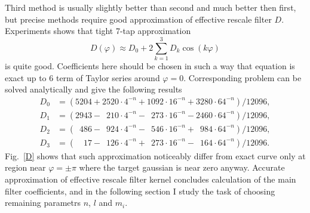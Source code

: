 \documentclass[10pt]{article}
\begin{document}
Third method is usually slightly better than second and much better then first, but precise methods
require good approximation of effective rescale filter $D$. Experiments shows that tight 7-tap
approximation
\begin{equation}
    D(\varphi) \approx D_0 + 2\sum_{k=1}^3 D_k\cos(k\varphi)
\end{equation}
is quite good. Coefficients here should be chosen in such a way that equation is exact up to 6
term of Taylor series around $\varphi = 0$. Corresponding problem can be solved analytically
and give the following results
\newcommand\0{\phantom{0}}
\begin{align}
    D_0 &= (   5204 +   2520\cdot4^{-n} +   1092\cdot16^{-n} +   3280\cdot64^{-n}) / 12096,\\
    D_1 &= (   2943 - \0 210\cdot4^{-n} - \0 273\cdot16^{-n} -   2460\cdot64^{-n}) / 12096,\\
    D_2 &= (\0  486 - \0 924\cdot4^{-n} - \0 546\cdot16^{-n} + \0 984\cdot64^{-n}) / 12096,\\
    D_3 &= (\0\0 17 - \0 126\cdot4^{-n} + \0 273\cdot16^{-n} - \0 164\cdot64^{-n}) / 12096.
\end{align}
Fig.~\ref{D} shows that such approximation noticeably differ from exact curve only at region near
$\varphi = \pm\pi$ where the target gaussian is near zero anyway. Accurate approximation of
effective rescale filter kernel concludes calculation of the main filter coefficients, and in the
following section I study the task of choosing remaining parametrs $n$, $l$ and $m_i$.
\end{document}
